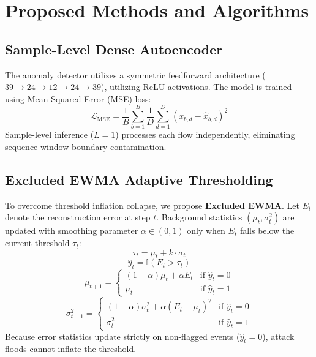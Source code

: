 \documentclass{ieeeaccess}
\begin{document}
\section{Proposed Methods and Algorithms}
\label{sec:methods}

\subsection{Sample-Level Dense Autoencoder}
The anomaly detector utilizes a symmetric feedforward architecture ($39 \to 24 \to 12 \to 24 \to 39$), utilizing ReLU activations. The model is trained using Mean Squared Error (MSE) loss:
\begin{equation}
\mathcal{L}_{\text{MSE}} = \frac{1}{B} \sum_{b=1}^B \frac{1}{D} \sum_{d=1}^D (x_{b,d} - \hat{x}_{b,d})^2
\end{equation}
Sample-level inference ($L=1$) processes each flow independently, eliminating sequence window boundary contamination.

\subsection{Excluded EWMA Adaptive Thresholding}
To overcome threshold inflation collapse, we propose \textbf{Excluded EWMA}. Let $E_t$ denote the reconstruction error at step $t$. Background statistics $(\mu_t, \sigma_t^2)$ are updated with smoothing parameter $\alpha \in (0, 1)$ only when $E_t$ falls below the current threshold $\tau_t$:
\begin{equation}
\tau_t = \mu_t + k \cdot \sigma_t
\end{equation}
\begin{equation}
\hat{y}_t = \mathbb{I}(E_t > \tau_t)
\end{equation}
\begin{equation}
\mu_{t+1} = 
\begin{cases} 
(1 - \alpha)\mu_t + \alpha E_t & \text{if } \hat{y}_t = 0 \\
\mu_t & \text{if } \hat{y}_t = 1
\end{cases}
\end{equation}
\begin{equation}
\sigma_{t+1}^2 = 
\begin{cases} 
(1 - \alpha)\sigma_t^2 + \alpha (E_t - \mu_t)^2 & \text{if } \hat{y}_t = 0 \\
\sigma_t^2 & \text{if } \hat{y}_t = 1
\end{cases}
\end{equation}
Because error statistics update strictly on non-flagged events ($\hat{y}_t = 0$), attack floods cannot inflate the threshold.
\end{document}
